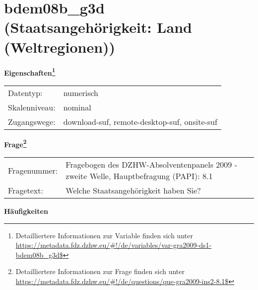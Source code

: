 
    \setcounter{footnote}{0}

    \vspace*{-1.8cm}
	\section{bdem08b\_g3d (Staatsangehörigkeit: Land (Weltregionen))}
	\label{section:bdem08b_g3d}



    \vspace*{0.5cm}
    \noindent\textbf{Eigenschaften\footnote{Detailliertere Informationen zur Variable finden sich unter
		\url{https://metadata.fdz.dzhw.eu/\#!/de/variables/var-gra2009-ds1-bdem08b_g3d$}}}\\
	\begin{tabularx}{\hsize}{@{}lX}
	Datentyp: & numerisch \\
	Skalenniveau: & nominal \\
	Zugangswege: &
	  download-suf, 
	  remote-desktop-suf, 
	  onsite-suf
 \\
    \end{tabularx}



				\vspace*{0.5cm}
                \noindent\textbf{Frage\footnote{Detailliertere Informationen zur Frage finden sich unter
		              \url{https://metadata.fdz.dzhw.eu/\#!/de/questions/que-gra2009-ins2-8.1$}}}\\
				\begin{tabularx}{\hsize}{@{}lX}
					Fragenummer: &
					  Fragebogen des DZHW-Absolventenpanels 2009 - zweite Welle, Hauptbefragung (PAPI):
					  8.1
 \\
					Fragetext: & Welche Staatsangehörigkeit haben Sie? \\
				\end{tabularx}





        		\vspace*{0.5cm}
                \noindent\textbf{Häufigkeiten}

